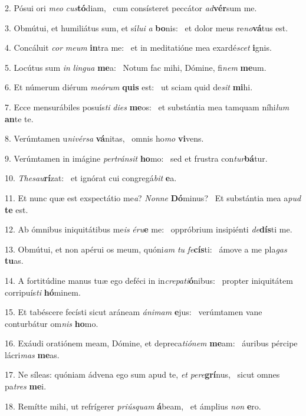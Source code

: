 2. Pósui ori \textit{me}\textit{o} \textit{cus}\textbf{tó}diam, \ast\  cum consísteret peccátor \textit{ad}\textbf{vér}sum me.\

3. Obmútui, et humiliátus sum, et sí\textit{lu}\textit{i} \textit{a} \textbf{bo}nis: \ast\  et dolor meus re\textit{no}\textbf{vá}tus est.\

4. Concáluit \textit{cor} \textit{me}\textit{um} \textbf{in}tra me: \ast\  et in meditatióne mea exardé\textit{scet} \textbf{i}gnis.\

5. Locútus sum \textit{in} \textit{lin}\textit{gua} \textbf{me}a: \ast\  Notum fac mihi, Dómine, fi\textit{nem} \textbf{me}um.\

6. Et númerum diérum \textit{me}\textit{ó}\textit{rum} \textbf{quis} est: \ast\  ut sciam quid de\textit{sit} \textbf{mi}hi.\

7. Ecce mensurábiles posuís\textit{ti} \textit{di}\textit{es} \textbf{me}os: \ast\  et substántia mea tamquam níhi\textit{lum} \textbf{an}te te.\

8. Verúmtamen u\textit{ni}\textit{vér}\textit{sa} \textbf{vá}nitas, \ast\  omnis ho\textit{mo} \textbf{vi}vens.\

9. Verúmtamen in imágine \textit{per}\textit{tráns}\textit{it} \textbf{ho}mo: \ast\  sed et frustra con\textit{tur}\textbf{bá}tur.\

10. \textit{The}\textit{sau}\textbf{rí}zat: \ast\  et ignórat cui congregá\textit{bit} \textbf{e}a.\

11. Et nunc quæ est exspectátio me\textit{a}? \textit{Non}\textit{ne} \textbf{Dó}minus? \ast\  Et substántia mea a\textit{pud} \textbf{te} est.\

12. Ab ómnibus iniquitátibus me\textit{is} \textit{é}\textit{ru}\textbf{e} me: \ast\  oppróbrium insipiénti \textit{de}\textbf{dís}ti me.\

13. Obmútui, et non apérui os meum, quóni\textit{am} \textit{tu} \textit{fe}\textbf{cís}ti: \ast\  ámove a me pla\textit{gas} \textbf{tu}as.\

14. A fortitúdine manus tuæ ego deféci in in\textit{cre}\textit{pa}\textit{ti}\textbf{ó}nibus: \ast\  propter iniquitátem corripuís\textit{ti} \textbf{hó}minem.\

15. Et tabéscere fecísti sicut aráneam \textit{á}\textit{ni}\textit{mam} \textbf{e}jus: \ast\  verúmtamen vane conturbátur om\textit{nis} \textbf{ho}mo.\

16. Exáudi oratiónem meam, Dómine, et depreca\textit{ti}\textit{ó}\textit{nem} \textbf{me}am: \ast\  áuribus pércipe lácri\textit{mas} \textbf{me}as.\

17. Ne síleas: quóniam ádvena ego sum apud te, \textit{et} \textit{per}\textit{e}\textbf{grí}nus, \ast\  sicut omnes pa\textit{tres} \textbf{me}i.\

18. Remítte mihi, ut refrígerer \textit{pri}\textit{ús}\textit{quam} \textbf{á}beam, \ast\  et ámplius \textit{non} \textbf{e}ro.\

